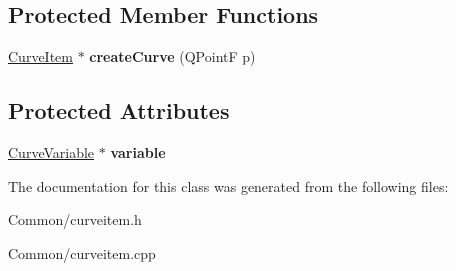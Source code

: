 \subsection*{\-Protected \-Member \-Functions}
\begin{DoxyCompactItemize}
\item 
\hypertarget{class_curve_item_ae1f00b18dab0e9b5578fb201d57f7c47}{
\hyperlink{class_curve_item}{\-Curve\-Item} $\ast$ {\bfseries create\-Curve} (\-Q\-Point\-F p)}
\label{class_curve_item_ae1f00b18dab0e9b5578fb201d57f7c47}

\end{DoxyCompactItemize}
\subsection*{\-Protected \-Attributes}
\begin{DoxyCompactItemize}
\item 
\hypertarget{class_curve_item_adb37dd4eaa82b1c96c8db03e94da6b59}{
\hyperlink{class_curve_variable}{\-Curve\-Variable} $\ast$ {\bfseries variable}}
\label{class_curve_item_adb37dd4eaa82b1c96c8db03e94da6b59}

\end{DoxyCompactItemize}


\-The documentation for this class was generated from the following files\-:\begin{DoxyCompactItemize}
\item 
\-Common/curveitem.\-h\item 
\-Common/curveitem.\-cpp\end{DoxyCompactItemize}
